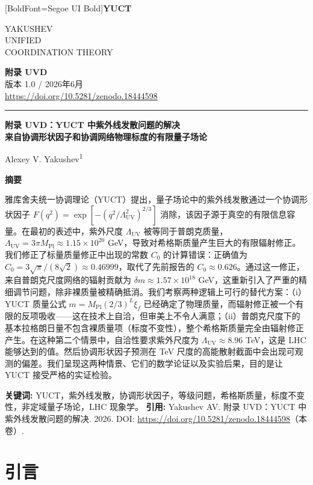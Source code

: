 \documentclass[11pt,a4paper]{article}
\newcommand{\Mpl}{M_{\mathrm{Pl}}}
\newcommand{\LUV}{\Lambda_{\mathrm{UV}}}
\theoremstyle{remark}
\newcommand{\makeheader}{%
	\noindent
	\begin{minipage}{0.17\textwidth}
		\raggedright
		{\fontspec{Segoe UI}[BoldFont=Segoe UI Bold]\bfseries\color{skyblue}\fontsize{46}{46}\selectfont YUCT}%
	\end{minipage}%
	\hspace{30pt}
	\begin{minipage}{0.32\textwidth}
		\raggedright
		{\sffamily\fontsize{11}{13}\selectfont YAKUSHEV\\ UNIFIED\\ COORDINATION THEORY}%
	\end{minipage}%
	\hfill
	\begin{minipage}{0.38\textwidth}
		\raggedleft
		{\sffamily\bfseries 附录 UVD}\\ 
		{\sffamily 版本 1.0 / 2026年6月}\\ 
		{\sffamily\footnotesize \url{https://doi.org/10.5281/zenodo.18444598}}%
	\end{minipage}
	\par\vspace{5pt}
	\noindent\textcolor{gold}{\rule{\textwidth}{1.6pt}}
	\par\vspace{0pt}
}
\begin{document}
	
	\thispagestyle{firstpage}
	\makeheader
	
	\vspace{0.5cm}
	{\LARGE\bfseries 附录 UVD：YUCT 中紫外线发散问题的解决 \\
		\Large 来自协调形状因子和协调网络物理标度的有限量子场论 \par}
	\vspace{0.3cm}
	
	{\large Alexey V. Yakushev\textsuperscript{1}} \\
	\vspace{0.2cm}
	
	{\color{darkblue}\textbf{\LARGE 摘要}} \par
	{\large
		\noindent
		雅库舍夫统一协调理论（YUCT）提出，量子场论中的紫外线发散通过一个协调形状因子 \(F(q^2) = \exp[-(q^2/\LUV^2)^{2/3}]\) 消除，该因子源于真空的有限信息容量。在最初的表述中，紫外尺度 \(\LUV\) 被等同于普朗克质量，\(\LUV = 3\pi\Mpl \approx 1.15\times 10^{20}\) GeV，导致对希格斯质量产生巨大的有限辐射修正。我们修正了标量质量修正中出现的常数 \(C_0\) 的计算错误：正确值为 \(C_0 = 3\sqrt{\pi}/(8\sqrt{2}) \approx 0.46999\)，取代了先前报告的 \(C_0 \approx 0.626\)。通过这一修正，来自普朗克尺度网络的辐射贡献为 \(\delta m \approx 1.57\times 10^{18}\) GeV，这重新引入了严重的精细调节问题，除非裸质量被精确抵消。我们考察两种逻辑上可行的替代方案：（i）YUCT 质量公式 \(m = \Mpl(2/3)^L\xi_f\) 已经确定了物理质量，而辐射修正被一个有限的反项吸收——这在技术上自洽，但审美上不令人满意；（ii）普朗克尺度下的基本拉格朗日量不包含裸质量项（标度不变性），整个希格斯质量完全由辐射修正产生。在这种第二个情景中，自洽性要求紫外尺度为 \(\LUV \approx 8.96\) TeV，这是 LHC 能够达到的值。然后协调形状因子预测在 TeV 尺度的高能散射截面中会出现可观测的偏差。我们呈现这两种情景、它们的数学论证以及实验后果，目的是让 YUCT 接受严格的实证检验。
	}
	
	\vspace{0.2cm}
	\noindent
	{\color{darkblue}\textbf{关键词:}} YUCT，紫外线发散，协调形状因子，等级问题，希格斯质量，标度不变性，非定域量子场论，LHC 现象学。
	\vspace{0.1cm}
	\noindent
	{\color{darkblue}\textbf{引用:}} Yakushev AV. 附录 UVD：YUCT 中紫外线发散问题的解决. 2026. DOI: \url{https://doi.org/10.5281/zenodo.18444598}（本卷）.
	
	\vspace{0.5cm}
	
	\section{引言}
	\label{sec:intro}
	
\end{document}
